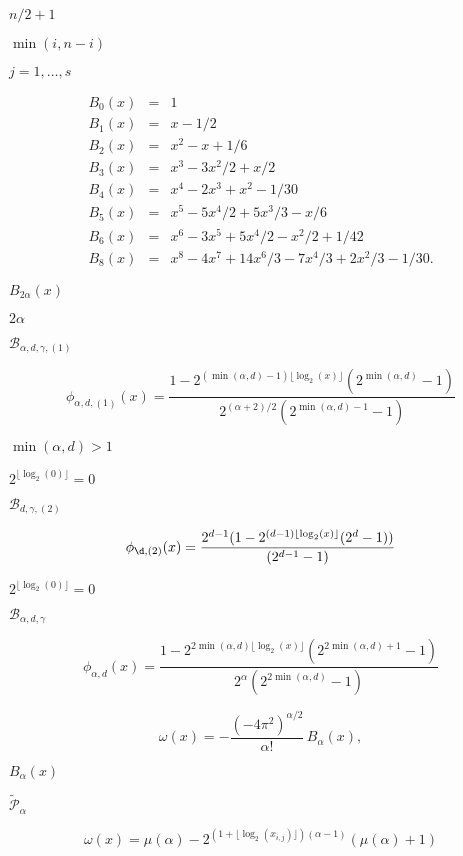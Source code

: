 \documentclass{article}
\begin{document}
$ n / 2 + 1 $
\pagebreak

$ \min(i, n - i) $
\pagebreak

$j=1,\dots,s$
\pagebreak

\begin{eqnarray*}   B_0(x) &=& 1 \\
   B_1(x) &=& x - 1/2 \\
   B_2(x) &=& x^2 - x + 1/6  \\
   B_3(x) &=& x^3 - 3x^2/2 + x/2  \\
   B_4(x) &=& x^4 - 2x^3 + x^2 - 1/30 \\
   B_5(x) &=& x^5 - 5x^4/2 + 5x^3/3 - x/6 \\
   B_6(x) &=& x^6 - 3x^5 + 5x^4/2 - x^2/2 + 1/42 \\
   B_8(x) &=& x^8 - 4x^7 + 14x^6/3 - 7x^4/3 + 2x^2/3 - 1/30.
\end{eqnarray*}
\pagebreak

$B_{2\alpha}(x)$
\pagebreak

$2\alpha$
\pagebreak

$\mathcal B_{\alpha, d, \gamma, (1)}$
\pagebreak

\[     \phi_{\alpha, d, (1)}(x) =
     \frac{1 - 2^{(\min(\alpha, d) -1) \lfloor \log_2(x) \rfloor} (2^{\min(\alpha, d)} -1)}{2^{(\alpha+2)/2} (2^{\min(\alpha, d) - 1} -1) }
\]
\pagebreak

$ \min(\alpha, d) > 1 $
\pagebreak

$2^{\lfloor \log_2(0) \rfloor}
= 0$
\pagebreak

$\mathcal B_{d, \gamma, (2)}$
\pagebreak

\[   \phi_{\d, (2)}(x) =
   \frac{2^{d-1}(1 - 2^{(d -1) \lfloor \log_2(x) \rfloor} (2^{d} -1))}{(2^{d - 1} -1) }
\]
\pagebreak

$2^{\lfloor \log_2(0) \rfloor} = 0$
\pagebreak

$\mathcal B_{\alpha, d, \gamma}$
\pagebreak

\[     \phi_{\alpha, d}(x) =
     \frac{1 - 2^{2 \min(\alpha, d) \lfloor \log_2(x) \rfloor} (2^{2 \min(\alpha, d) + 1} -1)}{2^{\alpha} (2^{2 \min(\alpha, d)} -1) }
\]
\pagebreak

\[   \omega(x) =
   -\frac{(-4\pi^2)^{\alpha/2}}{\alpha!} \, B_\alpha(x),
\]
\pagebreak

$B_\alpha(x)$
\pagebreak

$\tilde{\mathcal{P}}_{\alpha}$
\pagebreak

\[   \omega(x) = \mu(\alpha)  - 2^{(1+ \lfloor \log_{2}(x_{i,j}) \rfloor)(\alpha-1)}(\mu(\alpha)+1)
\]
\pagebreak
\end{document}
